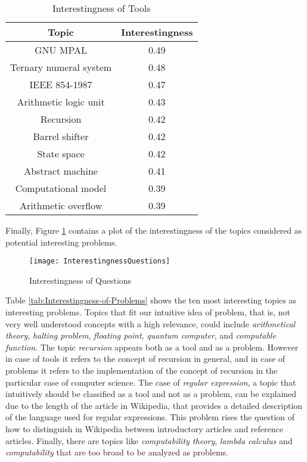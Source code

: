 \begin{table}
\begin{centering}
\begin{tabular}{|c|c|}
\hline 
Topic & Interestingness\tabularnewline
\hline 
\hline 
GNU MPAL & 0.49\tabularnewline
\hline 
Ternary numeral system & 0.48\tabularnewline
\hline 
IEEE 854-1987 & 0.47\tabularnewline
\hline 
Arithmetic logic unit & 0.43\tabularnewline
\hline 
Recursion & 0.42\tabularnewline
\hline 
Barrel shifter & 0.42\tabularnewline
\hline 
State space & 0.42\tabularnewline
\hline 
Abstract machine & 0.41\tabularnewline
\hline 
Computational model & 0.39\tabularnewline
\hline 
Arithmetic overflow & 0.39\tabularnewline
\hline 
\end{tabular}
\par\end{centering}

\caption{\label{tab:Interestingness-of-Tools}Interestingness of Tools}
\end{table}

Finally, Figure \ref{fig:Interestingness-of-Questions} contains a
plot of the interestingness of the topics considered as potential
interesting problems.

\begin{figure}[h]
\centering\texttt{[image: InterestingnessQuestions]}
\caption{\label{fig:Interestingness-of-Questions}Interestingness of Questions}
\end{figure}

Table \ref{tab:Interestingness-of-Problems} shows the ten most interesting
topics as interesting problems. Topics that fit our intuitive idea
of problem, that is, not very well understood concepts with a high
relevance, could include \emph{arithmetical theory}, \emph{halting
problem}, \emph{floating point}, \emph{quantum computer}, and \emph{computable
function}. The topic \emph{recursion} appears both as a tool and as
a problem. However in case of tools it refers to the concept of recursion
in general, and in case of problems it refers to the implementation
of the concept of recursion in the particular case of computer science.
The case of \emph{regular expression}, a topic that intuitively should
be classified as a tool and not as a problem, can be explained due
to the length of the article in Wikipedia, that provides a detailed
description of the language used for regular expressions. This problem
rises the question of how to distinguish in Wikipedia between introductory
articles and reference articles. Finally, there are topics like \emph{computability
theory}, \emph{lambda calculus} and \emph{computability} that are
too broad to be analyzed as problems.

